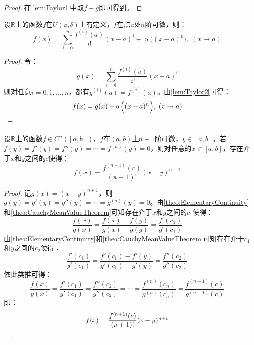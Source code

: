 \begin{proof}
	在\cref{lem:Taylor1}中取$f-g$即可得到。
\end{proof}
\begin{lemma}\label{lem:Taylor3}
	设$\mathbb{R}$上的函数$f$在$U(a,\delta)$上有定义，$f$在点$a$处$n$阶可微，则：
	\begin{equation*}
		f(x)=\sum_{i=0}^{n}\frac{f^{(i)}(a)}{i!}(x-a)^i+\operatorname{o}\Big((x-a)^n\Big),\;(x\to a)
	\end{equation*}
\end{lemma}
\begin{proof}
	令：
	\begin{equation*}
		g(x)=\sum_{i=0}^{n}\frac{f^{(i)}(a)}{i!}(x-a)^i
	\end{equation*}
	则对任意$i=0,1,\dots,n$，都有$g^{(i)}(a)=f^{(i)}(a)$。由\cref{lem:Taylor2}可得：
	\begin{equation*}
		f(x)=g(x)+\operatorname{o}\Big((x-a)^n\Big),\;(x\to a)\qedhere
	\end{equation*}
\end{proof}
\begin{lemma}\label{lem:Taylor4}
	设$\mathbb{R}$上的函数$f\in C^n([a,b])$，$f$在$(a,b)$上$n+1$阶可微，$y\in [a,b]$。若$f(y)=f'(y)=f''(y)=\cdots=f^{(n)}(y)=0$，则对任意的$x\in[a,b]$，存在介于$x$和$y$之间的$c$使得：
	\begin{equation*}
		f(x)=\frac{f^{(n+1)}(c)}{(n+1)!}(x-y)^{n+1}
	\end{equation*}
\end{lemma}
\begin{proof}
	记$g(x)=(x-y)^{n+1}$，则$g(y)=g'(y)=g''(y)=\cdots=g^{(n)}(y)=0$。由\cref{theo:ElementaryContinuity}和\cref{theo:CauchyMeanValueTheorem}可知存在介于$x$和$y$之间的$c_1$使得：
	\begin{equation*}
		\frac{f(x)}{g(x)}=\frac{f(x)-f(y)}{g(x)-g(y)}=\frac{f'(c_1)}{g'(c_1)}
	\end{equation*}
	由\cref{theo:ElementaryContinuity}和\cref{theo:CauchyMeanValueTheorem}可知存在介于$c_1$和$y$之间的$c_2$使得：
	\begin{equation*}
		\frac{f'(c_1)}{g'(c_1)}=\frac{f'(c_1)-f'(y)}{g'(c_1)-g'(y)}=\frac{f''(c_2)}{g''(c_2)}
	\end{equation*}
	依此类推可得：
	\begin{equation*}
		\frac{f(x)}{g(x)}=\frac{f'(c_1)}{g'(c_1)}=\frac{f''(c_2)}{g''(c_2)}=\cdots=\frac{f^{(n)}(c_n)}{g^{(n)}(c_n)}=\frac{f^{(n+1)}(c)}{g^{(n+1)}(c)}
	\end{equation*}
	即：
	\begin{equation*}
		f(x)=\frac{f^{(n+1)}(c)}{(n+1)!}(x-y)^{n+1}\qedhere
	\end{equation*}
\end{proof}
